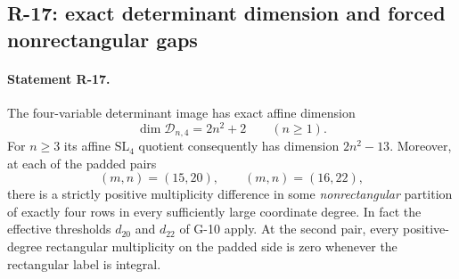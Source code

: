 \documentclass[11pt,a4paper]{article}
\theoremstyle{definition}\newtheorem{definition}{Definition}
\begin{document}
\subsection{R-17: exact determinant dimension and forced nonrectangular gaps}

\paragraph{Statement R-17.}
The four-variable determinant image has exact affine dimension
\begin{equation}\label{R17:detdimension}
 \dim\mathcal D_{n,4}=2n^2+2\qquad(n\geq1).
\end{equation}
For $n\geq3$ its affine $\mathrm{SL}_4$ quotient consequently
has dimension $2n^2-13$.
Moreover, at each of the padded pairs
\[
 (m,n)=(15,20),\qquad (m,n)=(16,22),
\]
there is a strictly positive multiplicity difference in some
\emph{nonrectangular} partition of exactly four rows in every
sufficiently large coordinate degree. In fact the effective
thresholds $d_{20}$ and $d_{22}$ of G-10 apply. At the second
pair, every positive-degree rectangular multiplicity on the
padded side is zero whenever the rectangular label is integral.
\end{document}
